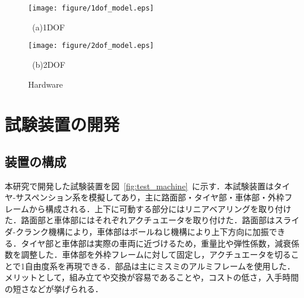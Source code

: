 \documentclass[a4paper,12pt]{article_vdlab_sotsuron}
\begin{document}
\vspace*{10mm}
\begin{figure}[h!]
  \begin{minipage}{0.5\hsize}
  \begin{center}
    \vspace*{10mm}
    \texttt{[image: figure/1dof\_model.eps]}
    \end{center}
    \begin{center}
    \vspace{3mm}
    \ (a)1DOF\
    \end{center}
  \end{minipage}
  \begin{minipage}{0.5\hsize}
     \begin{center}
      \texttt{[image: figure/2dof\_model.eps]}
      \end{center}
      \begin{center}
      \vspace{3mm}
      \ (b)2DOF\
    \end{center}
  \end{minipage}
  \vspace*{3mm}
  \caption{Hardware}
    \label{fig:hardware_12}
 \end{figure}

\newpage
\section{試験装置の開発}
\subsection{装置の構成}
本研究で開発した試験装置を図~\ref{fig:test_machine}~に示す．本試験装置はタイヤ-サスペンション系を模擬してあり，主に路面部・タイヤ部・車体部・外枠フレームから構成される．上下に可動する部分にはリニアベアリングを取り付けた．路面部と車体部にはそれぞれアクチュエータを取り付けた．路面部はスライダ-クランク機構により，車体部はボールねじ機構により上下方向に加振できる．タイヤ部と車体部は実際の車両に近づけるため，重量比や弾性係数，減衰係数を調整した．車体部を外枠フレームに対して固定し，アクチュエータを切ることで1自由度系を再現できる．部品は主にミスミのアルミフレームを使用した．メリットとして，組み立てや交換が容易であることや，コストの低さ，入手時間の短さなどが挙げられる．\par
\end{document}
